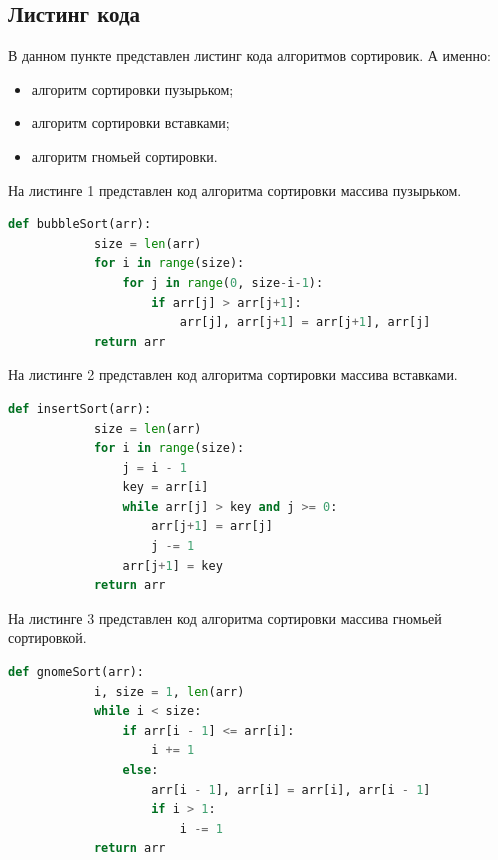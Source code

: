 \documentclass[a4paper, 12pt]{article}
\begin{document}
\begin{flushleft}
	\subsection{Листинг кода}
	В данном пункте представлен листинг кода алгоритмов сортировик.\cite{yandexSortAlg} А именно:
	\begin{itemize}
		\item алгоритм сортировки пузырьком;
		\item алгоритм сортировки вставками;
		\item алгоритм гномьей сортировки.
	\end{itemize}


	\lstset{style=mystyle}

	\hspace*{5mm} На листинге 1 представлен код алгоритма сортировки массива пузырьком.
	\begin{lstlisting}[language=Python, caption = Алгоритм сортировки пузырьком]
		def bubbleSort(arr):
			size = len(arr) 
			for i in range(size):
				for j in range(0, size-i-1):
					if arr[j] > arr[j+1]:
						arr[j], arr[j+1] = arr[j+1], arr[j]
			return arr
	\end{lstlisting}

	\hspace*{5mm} На листинге 2 представлен код алгоритма сортировки массива вставками.
	\begin{lstlisting}[language=Python, caption = Алгоритм сортировки вставками]
		def insertSort(arr):
			size = len(arr)
			for i in range(size):
				j = i - 1
				key = arr[i]
				while arr[j] > key and j >= 0:
					arr[j+1] = arr[j]
					j -= 1
				arr[j+1] = key
			return arr
	\end{lstlisting}
	\clearpage
	\newpage
	\hspace*{5mm} На листинге 3 представлен код алгоритма сортировки массива гномьей сортировкой.
	\begin{lstlisting}[language=Python, caption =  Алгоритм гномьей сортировки]
		def gnomeSort(arr):
			i, size = 1, len(arr)
			while i < size:
				if arr[i - 1] <= arr[i]:
					i += 1
				else:
					arr[i - 1], arr[i] = arr[i], arr[i - 1] 
					if i > 1:
						i -= 1
			return arr
	\end{lstlisting}

\end{flushleft}
\end{document}
